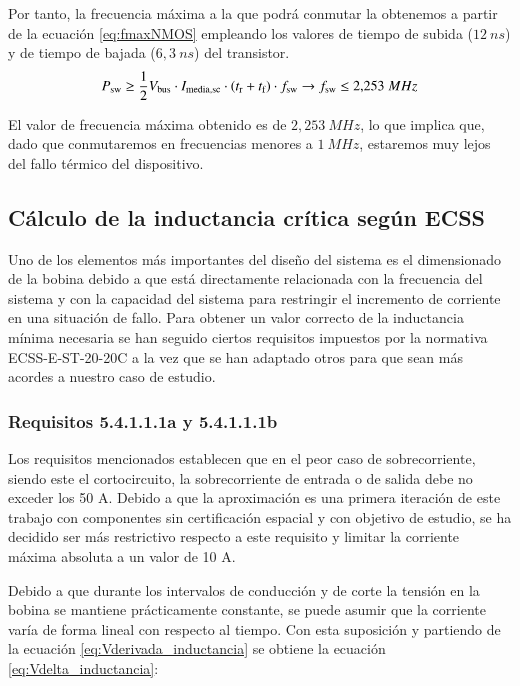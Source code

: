 \documentclass[12pt]{report} %
\begin{document}
Por tanto, la frecuencia máxima a la que podrá conmutar la obtenemos a partir de la ecuación \ref{eq:fmaxNMOS} empleando los valores de tiempo de subida ($12~ns$) y de tiempo de bajada ($6{,}3~ns$) del transistor. 
\begin{equation}
    \label{eq:fmaxNMOS}
    P_{\text{sw}} \geq \frac{1}{2} V_{\text{bus}} \cdot I_{\text{media,sc}}\cdot (t_\text{r}+t_\text{f})\cdot f_{\text{sw}} \rightarrow f_{\text{sw}} \leq 2{,}253~MHz
\end{equation}

El valor de frecuencia máxima obtenido es de $2{,}253~MHz$, lo que implica que, dado que conmutaremos en frecuencias menores a $1~MHz$, estaremos muy lejos del fallo térmico del dispositivo.

\subsection{Cálculo de la inductancia crítica según ECSS}
\label{subsec:inductanciaECSS}
Uno de los elementos más importantes del diseño del sistema es el dimensionado de la bobina debido a que está directamente relacionada con la frecuencia del sistema y con la capacidad del sistema para restringir el incremento de corriente en una situación de fallo. Para obtener un valor correcto de la inductancia mínima necesaria se han seguido ciertos requisitos impuestos por la normativa ECSS-E-ST-20-20C \cite{european_cooperation_for_space_standardization_ecss_ecss-e-st-20-20c_2016} a la vez que se han adaptado otros para que sean más acordes a nuestro caso de estudio.


\subsubsection{Requisitos 5.4.1.1.1a y 5.4.1.1.1b}

Los requisitos mencionados establecen que en el peor caso de sobrecorriente, siendo este el cortocircuito, la sobrecorriente de entrada o de salida debe no exceder los 50 A. Debido a que la aproximación es una primera iteración de este trabajo con componentes sin certificación espacial y con objetivo de estudio, se ha decidido ser más restrictivo respecto a este requisito y limitar la corriente máxima absoluta a un valor de 10 A. 

Debido a que durante los intervalos de conducción y de corte la tensión en la bobina se mantiene prácticamente constante, se puede asumir que la corriente varía de forma lineal con respecto al tiempo. Con esta suposición y partiendo de la ecuación \ref{eq:Vderivada_inductancia} se obtiene la ecuación \ref{eq:Vdelta_inductancia}: 
\end{document}
